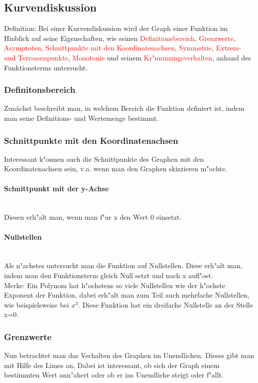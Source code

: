 \subsection{Kurvendiskussion}
Definition: Bei einer Kurvendiskussion wird der Graph einer Funktion im Hinblick auf seine Eigenschaften, wie seinen \textcolor{red}{Definitionsbereich}, \textcolor{red}{Grenzwerte}, \textcolor{red}{Asymptoten}, \textcolor{red}{Schnittpunkte mit den Koordinatenachsen}, \textcolor{red}{Symmetrie}, \textcolor{red}{Extrem- und Terrassenpunkte}, \textcolor{red}{Monotonie} und seinem \textcolor{red}{Kr"ummungsverhalten}, anhand des Funktionsterms untersucht.
\subsubsection{Definitonsbereich}
Zunächst beschreibt man, in welchem Bereich die Funktion definiert ist, indem man seine Definitions- und Wertemenge bestimmt.
\subsubsection{Schnittpunkte mit den Koordinatenachsen}
Interessant k"onnen auch die Schnittpunkte des Graphen mit den Koordinatenachsen sein, v.a. wenn man den Graphen skizzieren m"ochte.\\
\paragraph{Schnittpunkt mit der y-Achse}\hspace{2 cm}\\
Diesen erh"alt man, wenn man f"ur x den Wert 0 einsetzt.
\paragraph{Nullstellen}\hspace{2 cm}\\
Als n"achstes untersucht man die Funktion auf Nullstellen. Diese erh"alt man, indem man den Funktionsterm gleich Null setzt und nach x aufl"ost.\\
Merke: Ein Polynom hat h"ochstens so viele Nullstellen wie der h"ochste Exponent der Funktion, dabei erh"alt man zum Teil auch mehrfache Nullstellen, wie beispielsweise bei $x^3$. Diese Funktion hat ein dreifache Nullstelle an der Stelle x=0.
\subsubsection{Grenzwerte}
Nun betrachtet man das Verhalten des Graphen im Unendlichen. Dieses gibt man mit Hilfe des Limes an. Dabei ist interessant, ob sich der Graph einem bestimmten Wert ann"ahert oder ob er ins Unendliche steigt oder f"allt.
